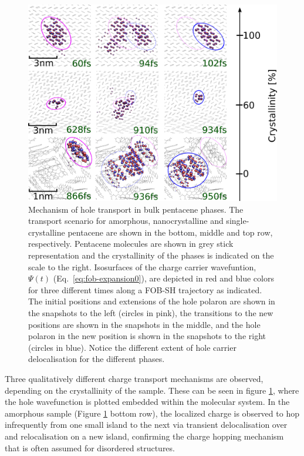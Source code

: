 \begin{figure}[htp]
  \includegraphics[width=\linewidth]{./img/DifferentQuenchTimes/ipr_3_samples.png}
  \caption{\label{fig:IPR}
  Mechanism of hole transport in bulk pentacene phases.
   The transport scenario for amorphous, nanocrystalline and single-crystalline pentacene are shown in the bottom, middle
  and top row, respectively. Pentacene molecules are shown in grey stick representation and the crystallinity of the phases is indicated on the scale to the right.
  Isosurfaces of the charge carrier wavefuntion, $\Psi (t)$ (Eq.~\ref{eq:fob-expansion0}), are depicted in red and blue colors for three different times along a FOB-SH trajectory
  as indicated. The initial positions and extensions of the hole polaron are shown in the snapshots to the left (circles in pink), the transitions to the
  new positions are shown in the snapshots in the middle, and the hole polaron in the new position is shown in the snapshots to the right (circles in blue).
  Notice the different extent of hole carrier delocalisation for the different phases.}
\end{figure}
Three qualitatively different charge transport mechanisms are observed, depending on the crystallinity of the sample. These can be seen in figure \ref{fig:IPR}, where the hole wavefunction is plotted embedded within the molecular system.
In the amorphous sample (Figure \ref{fig:IPR} bottom row), the localized charge is observed to hop infrequently from one small island to the next via transient
delocalisation over and relocalisation on a new island, confirming the charge hopping mechanism that is often assumed for disordered structures.
